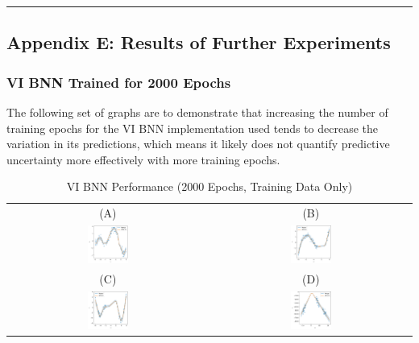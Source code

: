 \documentclass[conference]{IEEEtran}
\begin{document}
\par\noindent\rule{0.49\textwidth}{0.1pt}

\subsection*{Appendix E: Results of Further Experiments}
\subsubsection{VI BNN Trained for 2000 Epochs}
The following set of graphs are to demonstrate that increasing the number of training epochs for the VI BNN implementation used tends to decrease the variation in its predictions, which means it likely does not quantify predictive uncertainty more effectively with more training epochs.

\begin{table}[H]
\centering
\begin{tabular}{cc}
(A) & (B)\\
\includegraphics[width=0.21\textwidth]{images/vi_bnn--problem_A--sb--2000_epochs.png} & \includegraphics[width=0.21\textwidth]{images/vi_bnn--problem_B--sb--2000_epochs.png}\\
(C) & (D)\\
\includegraphics[width=0.21\textwidth]{images/vi_bnn--problem_C--sb--2000_epochs.png} & \includegraphics[width=0.21\textwidth]{images/vi_bnn--problem_D--sb--2000_epochs.png}
\end{tabular}
\caption{VI BNN Performance (2000 Epochs, Training Data Only)}
\label{tb4:table_of_figures}
\end{table}
\end{document}
